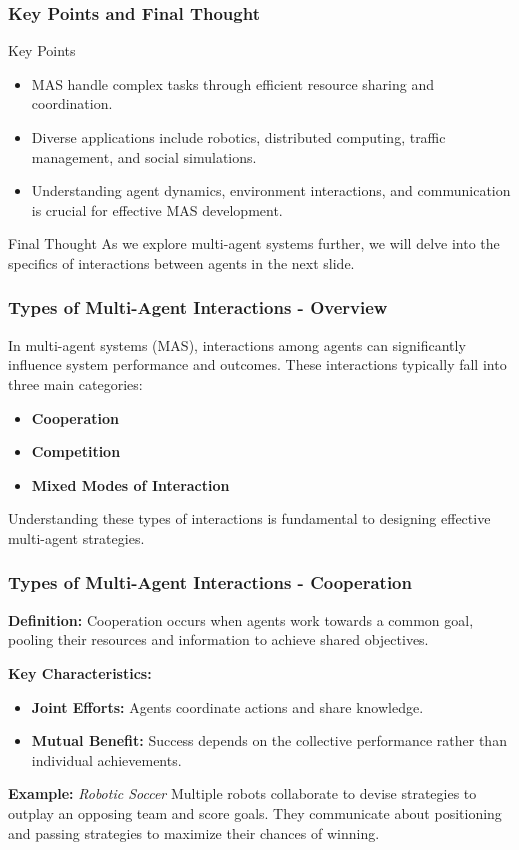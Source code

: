 \documentclass[aspectratio=169]{beamer}
\begin{document}
\begin{frame}[fragile]
    \frametitle{Key Points and Final Thought}
    \begin{block}{Key Points}
        \begin{itemize}
            \item MAS handle complex tasks through efficient resource sharing and coordination.
            \item Diverse applications include robotics, distributed computing, traffic management, and social simulations.
            \item Understanding agent dynamics, environment interactions, and communication is crucial for effective MAS development.
        \end{itemize}
    \end{block}
    \begin{block}{Final Thought}
        As we explore multi-agent systems further, we will delve into the specifics of interactions between agents in the next slide.
    \end{block}
\end{frame}

\begin{frame}[fragile]
    \frametitle{Types of Multi-Agent Interactions - Overview}
    In multi-agent systems (MAS), interactions among agents can significantly influence system performance and outcomes. 
    These interactions typically fall into three main categories:
    \begin{itemize}
        \item \textbf{Cooperation}
        \item \textbf{Competition}
        \item \textbf{Mixed Modes of Interaction}
    \end{itemize}
    Understanding these types of interactions is fundamental to designing effective multi-agent strategies.
\end{frame}

\begin{frame}[fragile]
    \frametitle{Types of Multi-Agent Interactions - Cooperation}
    \textbf{Definition:} Cooperation occurs when agents work towards a common goal, pooling their resources and information to achieve shared objectives.
    
    \textbf{Key Characteristics:}
    \begin{itemize}
        \item \textbf{Joint Efforts:} Agents coordinate actions and share knowledge.
        \item \textbf{Mutual Benefit:} Success depends on the collective performance rather than individual achievements.
    \end{itemize}

    \textbf{Example:} \textit{Robotic Soccer}
    Multiple robots collaborate to devise strategies to outplay an opposing team and score goals. They communicate about positioning and passing strategies to maximize their chances of winning.
\end{frame}
\end{document}
